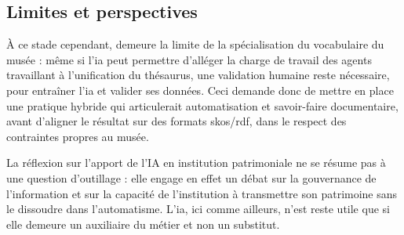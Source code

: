 \subsection{Limites et perspectives}

À ce stade cependant, demeure la limite de la spécialisation du vocabulaire du musée : même si l'\ac{ia} peut permettre d'alléger la charge de travail des agents travaillant à l'unification du thésaurus, une validation humaine reste nécessaire, pour entraîner l'\ac{ia} et valider ses données. Ceci demande donc de mettre en place une pratique hybride qui articulerait automatisation et savoir-faire documentaire, avant d'aligner le résultat sur des formats \ac{skos}/\ac{rdf}, dans le respect des contraintes propres au musée.

La réflexion sur l’apport de l’IA en institution patrimoniale ne se résume pas à une question d’outillage : elle engage en effet un débat sur la gouvernance de l’information et sur la capacité de l’institution à transmettre son patrimoine sans le dissoudre dans l’automatisme. L'\ac{ia}, ici comme ailleurs, n’est reste utile que si elle demeure un auxiliaire du métier et non un substitut. 